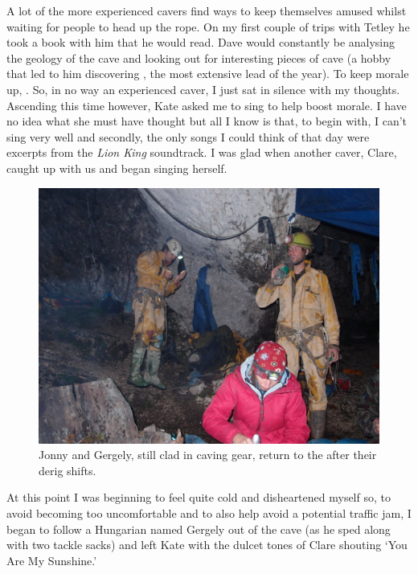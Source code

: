 A lot of the more experienced cavers find ways to keep themselves amused
whilst waiting for people to head up the rope. On my first couple of
trips with Tetley he took a book with him that he would read. Dave would
constantly be analysing the geology of the cave and looking out for
interesting pieces of cave (a hobby that led to him discovering
, the most extensive lead of the year). To keep morale up,
. So,
in no way an experienced caver, I just sat in silence with my thoughts.
Ascending this time however, Kate asked me to sing to help boost morale.
I have no idea what she must have thought but all I know is that, to
begin with, I can't sing very well and secondly, the only songs I could
think of that day were excerpts from the \textit{Lion King} soundtrack. I was
glad when another caver, Clare, caught up with us and began singing
herself.



\begin{figure}
\checkoddpage \ifoddpage \forcerectofloat \else \forceversofloat \fi
   \centering
\includegraphics[width = \textwidth]{2011/alex_pitcher_award/2011-08-09-22.45.35-Andy Jurd-P8091892--orig.jpg}
\caption{Jonny and Gergely, still clad in caving gear, return to the \protect{} after their derig shifts. } \label{derig end}
\end{figure}

At this point I was beginning to feel quite cold and disheartened myself
so, to avoid becoming too uncomfortable and to also help avoid a
potential traffic jam, I began to follow a Hungarian named Gergely out
of the cave (as he sped along with two tackle sacks) and left Kate with
the dulcet tones of Clare shouting `You Are My Sunshine.'


